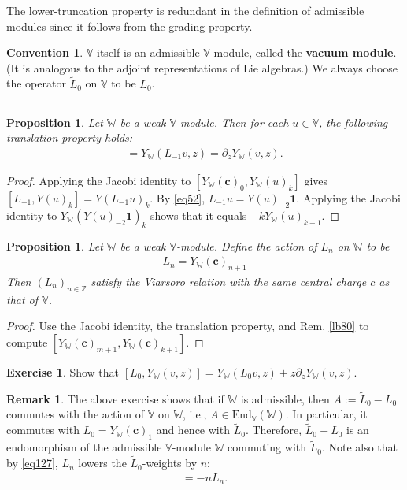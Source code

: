 \documentclass[11pt,b5paper,notitlepage]{article}
\theoremstyle{definition}
\newtheorem{exe}[df]{Exercise}
\newtheorem{rem}[df]{Remark}
\newtheorem{cv}[df]{Convention}
\theoremstyle{plain}
\newtheorem{pp}[df]{Proposition}
\newcommand{\wtd}{\widetilde}
\newcommand{\End}{\mathrm{End}} %
\newcommand{\id}{\mathbf{1}}
\newcommand{\Vbb}{\mathbb V}
\newcommand{\Wbb}{\mathbb W}
\newcommand{\Zbb}{\mathbb Z}
\newcommand{\cbf}{\mathbf c}
\numberwithin{equation}{section}
\begin{document}
The lower-truncation property is redundant in the definition of admissible modules since it follows from the grading property.

\begin{cv}
$\Vbb$ itself is an admissible $\Vbb$-module, called the \textbf{vacuum module}. (It is analogous to the adjoint representations of Lie algebras.) We always choose the operator $\wtd L_0$ on $\Vbb$ to be $L_0$.
\end{cv}


\subsection{}

\begin{pp}
Let $\Wbb$ be a weak $\Vbb$-module. Then for each $u\in\Vbb$, the following translation property holds:
\begin{align}
[L_{-1},Y_\Wbb(v,z)]=Y_\Wbb(L_{-1}v,z)=\partial_zY_\Wbb(v,z).	
\end{align}
\end{pp}
\begin{proof}
Applying the Jacobi identity to $[Y_\Wbb(\cbf)_0,Y_\Wbb(u)_k]$ gives $[L_{-1},Y(u)_k]=Y(L_{-1}u)_k$. By \eqref{eq52}, $L_{-1}u=Y(u)_{-2}\id$. Applying the Jacobi identity to $Y_\Wbb(Y(u)_{-2}\id)_k$ shows that it equals $-kY_\Wbb(u)_{k-1}$.
\end{proof}





\begin{pp}
Let $\Wbb$ be a weak $\Vbb$-module. Define the action of $L_n$ on $\Wbb$ to be
\begin{align}
L_n=Y_\Wbb(\cbf)_{n+1}	
\end{align}
Then $(L_n)_{n\in\Zbb}$ satisfy the Viarsoro relation with the same central charge $c$ as that of $\Vbb$.
\end{pp}
\begin{proof}
Use the Jacobi identity, the translation property, and Rem. \ref{lb80} to compute $[Y_\Wbb(\cbf)_{m+1},Y_\Wbb(\cbf)_{k+1}]$.
\end{proof}

\begin{exe}
Show that $[L_0,Y_\Wbb(v,z)]=Y_\Wbb(L_0v,z)+z\partial_zY_\Wbb(v,z)$.
\end{exe}

\begin{rem}\label{lb81}
The above exercise shows that if $\Wbb$ is admissible, then $A:=\wtd L_0-L_0$ commutes with the action of $\Vbb$ on $\Wbb$, i.e., $A\in\End_\Vbb(\Wbb)$. In particular, it commutes with $L_0=Y_\Wbb(\cbf)_1$ and hence with $\wtd L_0$. Therefore, $\wtd L_0-L_0$ is an endomorphism of the admissible $\Vbb$-module $\Wbb$ commuting with $\wtd L_0$. Note also that by \eqref{eq127}, $L_n$ lowers the $\wtd L_0$-weights by $n$:
\begin{align}
[\wtd L_0,L_n]=-nL_n.\label{eq134}	
\end{align}
\end{rem}
\end{document}
